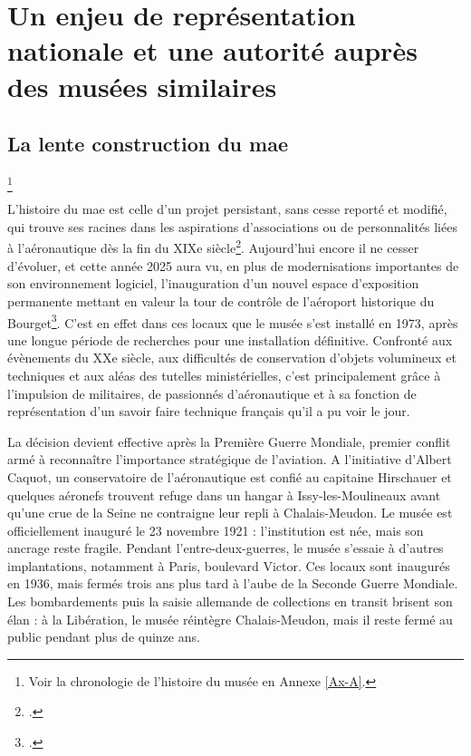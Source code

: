 \section{\label{I-A-1}Un enjeu de représentation nationale et une autorité auprès des musées similaires}

\subsection{La lente construction du \ac{mae}}\footnote{Voir la chronologie de l'histoire du musée en Annexe \ref{Ax-A}.}

L’histoire du \acf{mae} est celle d’un projet persistant, sans cesse reporté et modifié, qui trouve ses racines dans les aspirations d'associations ou de personnalités liées à l'aéronautique dès la fin du XIXe siècle\footcite{terrier_eroport_2019}. Aujourd'hui encore il ne cesser d'évoluer, et cette année 2025 aura vu, en plus de modernisations importantes de son environnement logiciel, l'inauguration d'un nouvel espace d'exposition permanente mettant en valeur la tour de contrôle de l'aéroport historique du Bourget\footcite{museedelairetdelespaceHallNavigationAerienne2025}. C'est en effet dans ces locaux que le musée s'est installé en 1973, après une longue période de recherches pour une installation définitive. Confronté aux évènements du XXe siècle, aux difficultés de conservation d'objets volumineux et techniques et aux aléas des tutelles ministérielles, c'est principalement grâce à l'impulsion de militaires, de passionnés d'aéronautique et à sa fonction de représentation d'un savoir faire technique français qu'il a pu voir le jour.

La décision devient effective après la Première Guerre Mondiale, premier conflit armé à reconnaître l'importance stratégique de l'aviation. A l'initiative d'Albert Caquot, un conservatoire de l'aéronautique est confié au capitaine Hirschauer et quelques aéronefs trouvent refuge dans un hangar à Issy-les-Moulineaux avant qu'une crue de la Seine ne contraigne leur repli à Chalais-Meudon. Le musée est officiellement inauguré le 23 novembre 1921 : l’institution est née, mais son ancrage reste fragile.
Pendant l’entre-deux-guerres, le musée s’essaie à d’autres implantations, notamment à Paris, boulevard Victor. Ces locaux sont inaugurés en 1936, mais fermés trois ans plus tard à l’aube de la Seconde Guerre Mondiale. Les bombardements puis la saisie allemande de collections en transit brisent son élan : à la Libération, le musée réintègre Chalais-Meudon, mais il reste fermé au public pendant plus de quinze ans.

